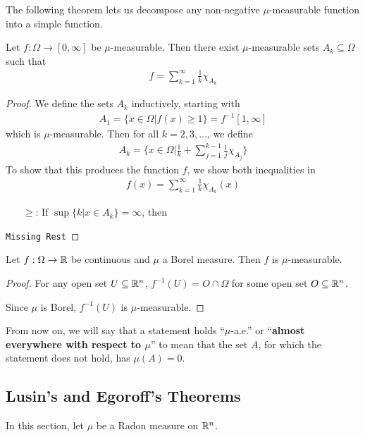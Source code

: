 The following theorem lets us decompose any non-negative $\mu$-measurable function into a simple function.
\begin{thm}[]
  Let $f: \Omega \to  [0,\infty]$ be $\mu$-measurable. Then there exist $\mu$-measurable sets $A_k \subseteq \Omega$ such that
  \begin{align*}
    f = \sum_{k=1}^{\infty} \frac{1}{k} \chi_{A_k}
  \end{align*}
\end{thm}
\begin{proof}
  We define the sets $A_k$ inductively, starting with
  \begin{align*}
    A_1 = \{x \in \Omega \big\vert f(x) \geq 1\} = f^{-1}[1, \infty]
  \end{align*}
  which is $\mu$-measurable. Then for all $k = 2,3, \ldots$, we define
  \begin{align*}
    A_k = \{x \in \Omega \big\vert \frac{1}{k} + \sum_{j=1}^{k-1} \frac{1}{j} \chi_{A_j}\}
  \end{align*}
  To show that this produces the function $f$, we show both inequalities in
  \begin{align*}
    f(x) = \sum_{k=1}^{\infty} \frac{1}{k} \chi_{A_k}(x)
  \end{align*}
  \begin{itemize}
    \item[$\geq$:] If $\sup \{k \big\vert x \in A_k\} = \infty$, then 
  \end{itemize}
  \texttt{Missing Rest}
\end{proof}

\begin{prop}[]
  Let $f: \Omega \to \mathbb{R}$ be continuous and $\mu$ a Borel measure.
  Then $f$ is $\mu$-measurable.
\end{prop}
\begin{proof}
  For any open set $U \subseteq \mathbb{R}^{n}$, $f^{-1}(U) = O \cap \Omega$ for some open set $O \subseteq \mathbb{R}^{n}$.

  Since $\mu$ is Borel, $f^{-1}(U)$ is $\mu$-measurable.
\end{proof}

From now on, we will say that a statement holds ``$\mu$-a.e.'' or ``\textbf{almost everywhere with respect to $\mu$}'' to mean that the set $A$, for which the statement does not hold, has $\mu(A) = 0$.



\subsection{Lusin's and Egoroff's Theorems}
In this section, let $\mu$ be a Radon measure on $\mathbb{R}^{n}$.

